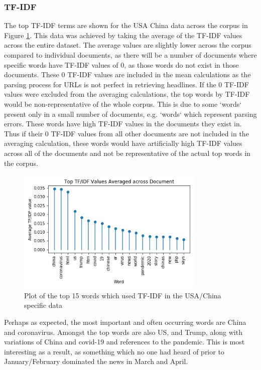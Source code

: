 \subsubsection{TF-IDF}
The top TF-IDF terms are shown for the USA China data across the corpus in Figure \ref{fig:tfidfusachina}. This data was achieved by taking the average of the TF-IDF values across the entire dataset. The average values are slightly lower across the corpus compared to individual documents, as there will be a number of documents where specific words have TF-IDF values of 0, as those words do not exist in those documents. These 0 TF-IDF values are included in the mean calculations as the parsing process for URLs is not perfect in retrieving headlines. If the 0 TF-IDF values were excluded from the averaging calculations, the top words by TF-IDF would be non-representative of the whole corpus. This is due to some `words` present only in a small number of documents, e.g. `words` which represent parsing errors. These words have high TF-IDF values in the documents they exist in. Thus if their 0 TF-IDF values from all other documents are not included in the averaging calculation, these words would have artificially high TF-IDF values across all of the documents and not be representative of the actual top words in the corpus.

\begin{figure}[H]
	\centering
	\includegraphics[width=0.8\textwidth]{Images/usa_stem_tfidf.png}
	\caption{Plot of the top 15 words which used TF-IDF in the USA/China specific data}
	\label{fig:tfidfusachina}
\end{figure}

Perhaps as expected, the most important and often occurring words are China and coronavirus.  Amongst the top words are also US, and Trump, along with variations of China and covid-19 and references to the pandemic. This is most interesting as a result, as something which no one had heard of prior to January/February dominated the news in March and April.

